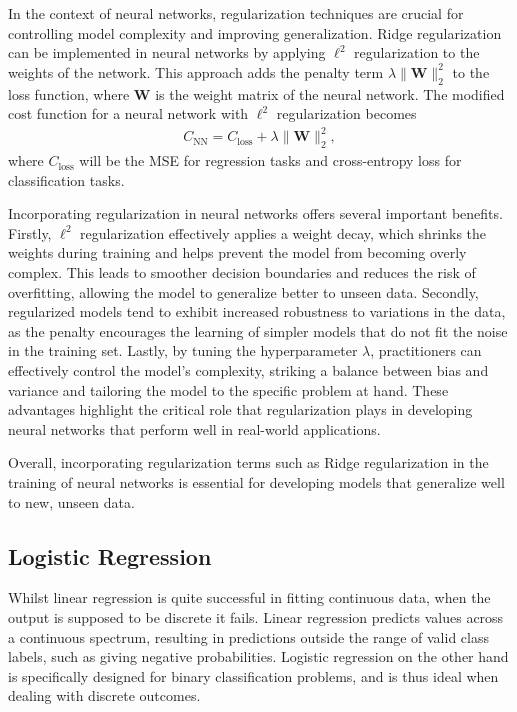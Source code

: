 \documentclass[%
reprint,s
amsmath,amssymb,
aps,
]{revtex4-2}
\begin{document}
In the context of neural networks, regularization techniques are crucial for controlling model complexity and improving generalization. Ridge regularization can be implemented in neural networks by applying \(\ell^2\) regularization to the weights of the network. This approach adds the penalty term \( \lambda \|\mathbf{W}\|_2^2 \) to the loss function, where \( \mathbf{W} \) is the weight matrix of the neural network. The modified cost function for a neural network with \(\ell^2\) regularization becomes
\begin{align}
	C_{\text{NN}}=C_{\text{loss}}+\lambda \|\mathbf{W}\|_2^2,
\end{align}
where \( C_{\text{loss}} \) will be the MSE for regression tasks and cross-entropy loss for classification tasks.

Incorporating regularization in neural networks offers several important benefits. Firstly, \(\ell^2\) regularization effectively applies a weight decay, which shrinks the weights during training and helps prevent the model from becoming overly complex. This leads to smoother decision boundaries and reduces the risk of overfitting, allowing the model to generalize better to unseen data. Secondly, regularized models tend to exhibit increased robustness to variations in the data, as the penalty encourages the learning of simpler models that do not fit the noise in the training set. Lastly, by tuning the hyperparameter \( \lambda \), practitioners can effectively control the model's complexity, striking a balance between bias and variance and tailoring the model to the specific problem at hand. These advantages highlight the critical role that regularization plays in developing neural networks that perform well in real-world applications.

Overall, incorporating regularization terms such as Ridge regularization in the training of neural networks is essential for developing models that generalize well to new, unseen data. 


\subsection{Logistic Regression}
Whilst linear regression is quite successful in fitting continuous data, when the output is supposed to be discrete it fails. Linear regression predicts values across a continuous spectrum, resulting in predictions outside the range of valid class labels, such as giving negative probabilities. Logistic regression on the other hand is specifically designed for binary classification problems, and is thus ideal when dealing with discrete outcomes. 
\end{document}
